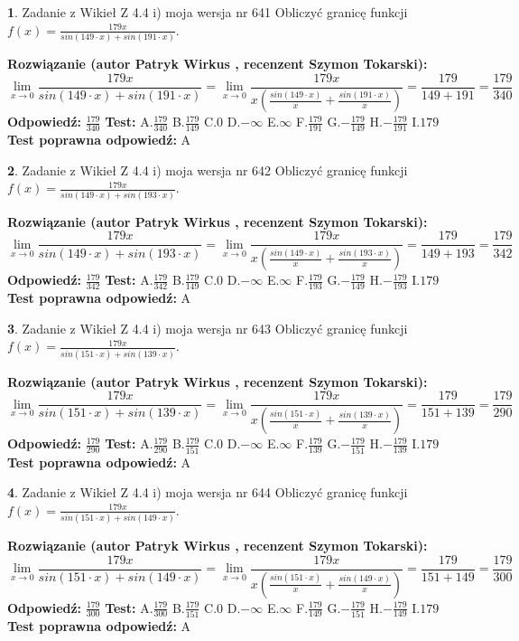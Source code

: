 \documentclass[12pt, a4paper]{article}
\theoremstyle{definition} %
\newtheorem{zad}{}
\newcommand{\zadStart}[1]{\begin{zad}#1\newline}
\newcommand{\zadStop}{\end{zad}}
\newcommand{\rozwStart}[2]{\noindent \textbf{Rozwiązanie (autor #1 , recenzent #2): }\newline}
\newcommand{\rozwStop}{\newline}
\newcommand{\odpStart}{\noindent \textbf{Odpowiedź:}\newline}
\newcommand{\odpStop}{\newline}
\newcommand{\testStart}{\noindent \textbf{Test:}\newline}
\newcommand{\testStop}{\newline}
\newcommand{\kluczStart}{\noindent \textbf{Test poprawna odpowiedź:}\newline}
\newcommand{\kluczStop}{\newline}
\begin{document}
\zadStart{Zadanie z Wikieł Z 4.4 i) moja wersja nr 641}
Obliczyć granicę funkcji $f(x)=\frac{179x}{sin(149\cdot x) +sin(191\cdot x)}$.
\zadStop
\rozwStart{Patryk Wirkus}{Szymon Tokarski}
$$\lim\limits_{x\to 0}\frac{179x}{sin(149\cdot x) +sin(191\cdot x)}=\lim\limits_{x\to 0}\frac{179x}{x(\frac{sin(149\cdot x)}{x}+\frac{sin(191\cdot x)}{x})}=\frac{179}{149+191} = \frac{179}{340}$$
\rozwStop
\odpStart
$\frac{179}{340}$
\odpStop
\testStart
A.$\frac{179}{340}$
B.$\frac{179}{149}$
C.$0$
D.$-\infty$
E.$\infty$
F.$\frac{179}{191}$
G.$-\frac{179}{149}$
H.$-\frac{179}{191}$
I.$179$
\testStop
\kluczStart
A
\kluczStop



\zadStart{Zadanie z Wikieł Z 4.4 i) moja wersja nr 642}
Obliczyć granicę funkcji $f(x)=\frac{179x}{sin(149\cdot x) +sin(193\cdot x)}$.
\zadStop
\rozwStart{Patryk Wirkus}{Szymon Tokarski}
$$\lim\limits_{x\to 0}\frac{179x}{sin(149\cdot x) +sin(193\cdot x)}=\lim\limits_{x\to 0}\frac{179x}{x(\frac{sin(149\cdot x)}{x}+\frac{sin(193\cdot x)}{x})}=\frac{179}{149+193} = \frac{179}{342}$$
\rozwStop
\odpStart
$\frac{179}{342}$
\odpStop
\testStart
A.$\frac{179}{342}$
B.$\frac{179}{149}$
C.$0$
D.$-\infty$
E.$\infty$
F.$\frac{179}{193}$
G.$-\frac{179}{149}$
H.$-\frac{179}{193}$
I.$179$
\testStop
\kluczStart
A
\kluczStop



\zadStart{Zadanie z Wikieł Z 4.4 i) moja wersja nr 643}
Obliczyć granicę funkcji $f(x)=\frac{179x}{sin(151\cdot x) +sin(139\cdot x)}$.
\zadStop
\rozwStart{Patryk Wirkus}{Szymon Tokarski}
$$\lim\limits_{x\to 0}\frac{179x}{sin(151\cdot x) +sin(139\cdot x)}=\lim\limits_{x\to 0}\frac{179x}{x(\frac{sin(151\cdot x)}{x}+\frac{sin(139\cdot x)}{x})}=\frac{179}{151+139} = \frac{179}{290}$$
\rozwStop
\odpStart
$\frac{179}{290}$
\odpStop
\testStart
A.$\frac{179}{290}$
B.$\frac{179}{151}$
C.$0$
D.$-\infty$
E.$\infty$
F.$\frac{179}{139}$
G.$-\frac{179}{151}$
H.$-\frac{179}{139}$
I.$179$
\testStop
\kluczStart
A
\kluczStop



\zadStart{Zadanie z Wikieł Z 4.4 i) moja wersja nr 644}
Obliczyć granicę funkcji $f(x)=\frac{179x}{sin(151\cdot x) +sin(149\cdot x)}$.
\zadStop
\rozwStart{Patryk Wirkus}{Szymon Tokarski}
$$\lim\limits_{x\to 0}\frac{179x}{sin(151\cdot x) +sin(149\cdot x)}=\lim\limits_{x\to 0}\frac{179x}{x(\frac{sin(151\cdot x)}{x}+\frac{sin(149\cdot x)}{x})}=\frac{179}{151+149} = \frac{179}{300}$$
\rozwStop
\odpStart
$\frac{179}{300}$
\odpStop
\testStart
A.$\frac{179}{300}$
B.$\frac{179}{151}$
C.$0$
D.$-\infty$
E.$\infty$
F.$\frac{179}{149}$
G.$-\frac{179}{151}$
H.$-\frac{179}{149}$
I.$179$
\testStop
\kluczStart
A
\kluczStop
\end{document}
